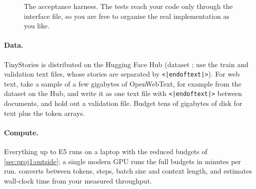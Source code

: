 \begin{figure}[t]
\centering
{}
\caption{The acceptance harness. The tests reach your code only through the interface file, so
you are free to organise the real implementation as you like.}
\label{fig:proj1:harness}
\end{figure}

\paragraph{Data.} TinyStories is distributed on the Hugging Face Hub
(dataset ; use the  train and
validation text files, whose stories are separated by \texttt{<|endoftext|>}). For web text,
take a sample of a few gigabytes of OpenWebText, for example from the
 dataset on the Hub, and write it as
one text file with \texttt{<|endoftext|>} between documents, and hold out a validation file. Budget
tens of gigabytes of disk for text plus the  token arrays.

\paragraph{Compute.} Everything up to E5 runs on a laptop with the reduced budgets of
\cref{sec:proj1:outside}; a single modern GPU runs the full budgets in minutes per run.
 converts between tokens, steps, batch size and context length, and estimates
wall-clock time from your measured throughput.

